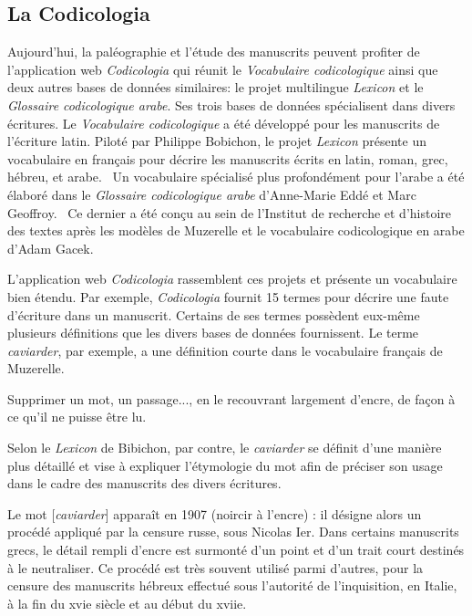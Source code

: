 \documentclass[class=article, crop=false]{standalone}
\begin{document}
\subsection{La Codicologia}

Aujourd'hui, la paléographie et l'étude des manuscrits peuvent profiter de l'application web \textit{Codicologia} qui réunit le \textit{Vocabulaire codicologique} ainsi que deux autres bases de données similaires: le projet multilingue \textit{Lexicon} et le \textit{Glossaire codicologique arabe}. Ses trois bases de données spécialisent dans divers écritures. Le \textit{Vocabulaire codicologique} a été développé pour les manuscrits de l'écriture latin. Piloté par Philippe Bobichon, le projet \textit{Lexicon} présente un vocabulaire en français pour décrire les manuscrits écrits en latin, roman, grec, hébreu, et arabe.~\autocite{bobichonLexiconMisePage2009} Un vocabulaire spécialisé plus profondément pour l'arabe a été élaboré dans le \textit{Glossaire codicologique arabe} d'Anne-Marie Eddé et Marc Geoffroy.~\autocite{GlossaireCodicologiqueFrancaisarabe2002} Ce dernier a été conçu au sein de l'Institut de recherche et d'histoire des textes après les modèles de Muzerelle et le vocabulaire codicologique en arabe d'Adam Gacek.~\autocite{gacekArabicManuscriptTradition2001}

L'application web \textit{Codicologia} rassemblent ces projets et présente un vocabulaire bien étendu. Par exemple, \textit{Codicologia} fournit 15 termes pour décrire une faute d'écriture dans un manuscrit. Certains de ses termes possèdent eux-même plusieurs définitions que les divers bases de données fournissent. Le terme \textit{caviarder}, par exemple, a une définition courte dans le vocabulaire français de Muzerelle. 

\begin{displayquote}
Supprimer un mot, un passage..., en le recouvrant largement d'encre, de façon à ce qu'il ne puisse être lu.~\autocite{muzerelleCaviarder2011}
\end{displayquote}

\noindent Selon le \textit{Lexicon} de Bibichon, par contre, le \textit{caviarder} se définit d'une manière plus détaillé et vise à expliquer l'étymologie du mot afin de préciser son usage dans le cadre des manuscrits des divers écritures.

\begin{displayquote}
Le mot [\textit{caviarder}] apparaît en 1907 (noircir à l'encre) : il désigne alors un procédé appliqué par la censure russe, sous Nicolas Ier. Dans certains manuscrits grecs, le détail rempli d'encre est surmonté d'un point et d'un trait court destinés à le neutraliser. Ce procédé est très souvent utilisé parmi d'autres, pour la censure des manuscrits hébreux effectué sous l'autorité de l'inquisition, en Italie, à la fin du xvie siècle et au début du xviie.~\autocite{bobichonCaviarder2011}


\end{displayquote}
\end{document}
